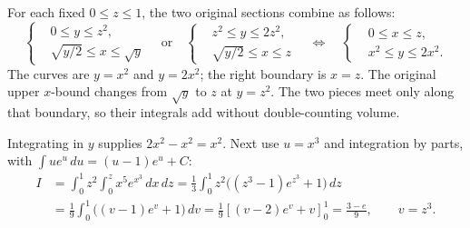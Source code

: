 \documentclass[12pt]{exam}
\begin{document}
\begin{enumerate}
\medskip
For each fixed $0\leq z\leq1$, the two original sections combine as follows:
\[
  \left\{
  \begin{aligned}
    &0\leq y\leq z^2,\\
    &\sqrt{y/2}\leq x\leq\sqrt{y}
  \end{aligned}
  \right.
  \quad\text{or}\quad
  \left\{
  \begin{aligned}
    &z^2\leq y\leq2z^2,\\
    &\sqrt{y/2}\leq x\leq z
  \end{aligned}
  \right.
  \quad\Longleftrightarrow\quad
  \left\{
  \begin{aligned}
    &0\leq x\leq z,\\
    &x^2\leq y\leq2x^2.
  \end{aligned}
  \right.
\]
The curves are $y=x^2$ and $y=2x^2$; the right boundary is $x=z$.
The original upper $x$-bound changes from $\sqrt{y}$ to $z$ at $y=z^2$.
The two pieces meet only along that boundary, so their integrals add
without double-counting volume.

Integrating in $y$ supplies $2x^2-x^2=x^2$. Next use $u=x^3$ and integration
by parts, with $\int ue^u\,du=(u-1)e^u+C$:
\[
\begin{aligned}
  I&=\int_0^1 z^2\int_0^z x^5e^{x^3}\,dx\,dz
    =\frac13\int_0^1 z^2\bigl((z^3-1)e^{z^3}+1\bigr)\,dz\\
   &=\frac19\int_0^1\bigl((v-1)e^v+1\bigr)\,dv
    =\frac19\left[(v-2)e^v+v\right]_0^1
    =\frac{3-e}{9},\qquad v=z^3.
\end{aligned}
\]

\end{enumerate}
\end{document}

